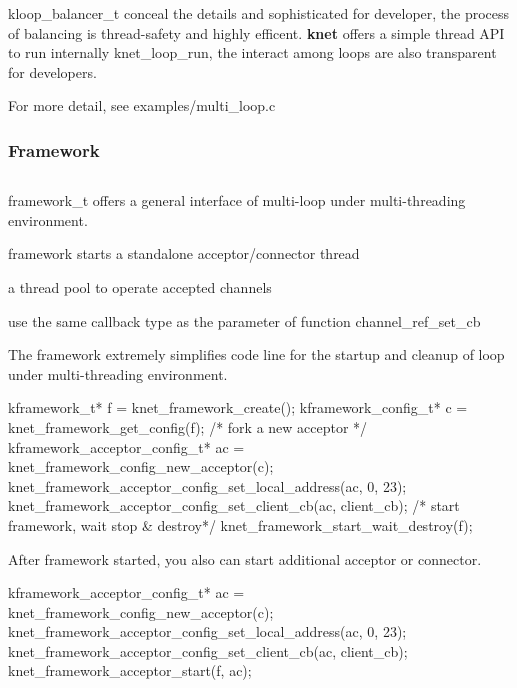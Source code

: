 {\ttfamily kloop\+\_\+balancer\+\_\+t} conceal the details and sophisticated for developer, the process of balancing is thread-\/safety and highly efficent. {\bfseries knet} offers a simple thread A\+P\+I to run internally {\ttfamily knet\+\_\+loop\+\_\+run}, the interact among loops are also transparent for developers.

For more detail, see {\ttfamily examples/multi\+\_\+loop.\+c}

\subsubsection*{Framework}

\subsection*{}

{\ttfamily framework\+\_\+t} offers a general interface of multi-\/loop under multi-\/threading environment.


\begin{DoxyItemize}
\item framework starts a standalone acceptor/connector thread
\item a thread pool to operate accepted channels
\item use the same callback type as the parameter of function {\ttfamily channel\+\_\+ref\+\_\+set\+\_\+cb}
\end{DoxyItemize}

The framework extremely simplifies code line for the startup and cleanup of loop under multi-\/threading environment. \begin{DoxyVerb}kframework_t* f = knet_framework_create();
kframework_config_t* c = knet_framework_get_config(f);
/* fork a new acceptor */
kframework_acceptor_config_t* ac = knet_framework_config_new_acceptor(c);
knet_framework_acceptor_config_set_local_address(ac, 0, 23);
knet_framework_acceptor_config_set_client_cb(ac, client_cb);
/* start framework, wait stop & destroy*/
knet_framework_start_wait_destroy(f);
\end{DoxyVerb}


After framework started, you also can start additional acceptor or connector. \begin{DoxyVerb}kframework_acceptor_config_t* ac = knet_framework_config_new_acceptor(c);
knet_framework_acceptor_config_set_local_address(ac, 0, 23);
knet_framework_acceptor_config_set_client_cb(ac, client_cb);
knet_framework_acceptor_start(f, ac);
\end{DoxyVerb}


